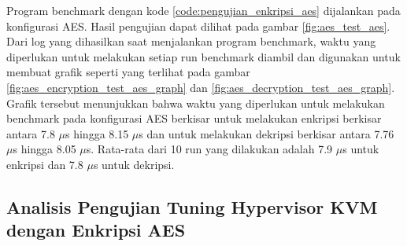 Program benchmark dengan kode \ref{code:pengujian_enkripsi_aes} dijalankan pada konfigurasi AES. Hasil pengujian dapat dilihat pada gambar \ref{fig:aes_test_aes}. Dari log yang dihasilkan saat menjalankan program benchmark, waktu yang diperlukan untuk melakukan setiap run benchmark diambil dan digunakan untuk membuat grafik seperti yang terlihat pada gambar \ref{fig:aes_encryption_test_aes_graph} dan \ref{fig:aes_decryption_test_aes_graph}. Grafik tersebut menunjukkan bahwa waktu yang diperlukan untuk melakukan benchmark pada konfigurasi AES berkisar untuk melakukan enkripsi berkisar antara 7.8 $\mu$s hingga 8.15 $\mu$s dan untuk melakukan dekripsi berkisar antara 7.76 $\mu$s hingga 8.05 $\mu$s. Rata-rata dari 10 run yang dilakukan adalah 7.9 $\mu$s untuk enkripsi dan 7.8 $\mu$s untuk dekripsi.

\subsection{Analisis Pengujian Tuning Hypervisor KVM dengan Enkripsi AES}


